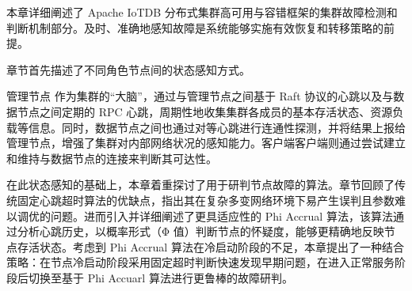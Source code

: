 本章详细阐述了 Apache IoTDB 分布式集群高可用与容错框架的集群故障检测和判断机制部分。及时、准确地感知故障是系统能够实施有效恢复和转移策略的前提。

章节首先描述了不同角色节点间的状态感知方式。


管理节点 作为集群的“大脑”，通过与管理节点之间基于 Raft 协议的心跳以及与数据节点之间定期的 RPC 心跳，周期性地收集集群各成员的基本存活状态、资源负载等信息。同时，数据节点之间也通过对等心跳进行连通性探测，并将结果上报给管理节点，增强了集群对内部网络状况的感知能力。客户端客户端则通过尝试建立和维持与数据节点的连接来判断其可达性。

在此状态感知的基础上，本章着重探讨了用于研判节点故障的算法。章节回顾了传统固定心跳超时算法的优缺点，指出其在复杂多变网络环境下易产生误判且参数难以调优的问题。进而引入并详细阐述了更具适应性的 Phi Accrual 算法，该算法通过分析心跳历史，以概率形式（Φ 值）判断节点的怀疑度，能够更精确地反映节点存活状态。考虑到 Phi Accrual 算法在冷启动阶段的不足，本章提出了一种结合策略：在节点冷启动阶段采用固定超时判断快速发现早期问题，在进入正常服务阶段后切换至基于 Phi Accuarl 算法进行更鲁棒的故障研判。